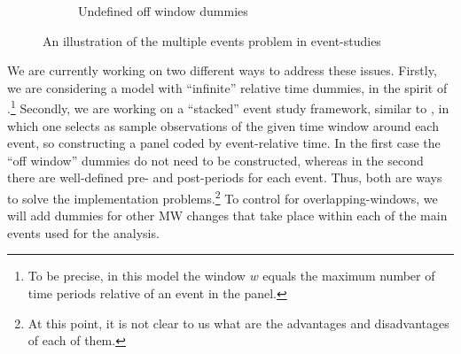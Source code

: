 \begin{figure}[t!]
\begin{subfigure}{1\textwidth}
            \caption{Undefined off window dummies}
        \end{subfigure}
        \caption{An illustration of the multiple events problem in event-studies}
        \label{fig:multiple-events-example}
    \end{figure}
    
    We are currently working on two different ways to address these issues. Firstly, we are considering a model with ``infinite'' relative time dummies, in the spirit of \textcite[][, equation 1]{BorusyakJaravel2017}.\footnote{To be precise, in this model the window $w$ equals the maximum number of time periods relative of an event in the panel.} Secondly, we are working on a ``stacked'' event study framework, similar to \textcite{cengiz2019effect}, in which one selects as sample observations of the given time window around each event, so constructing a panel coded by event-relative time. In the first case the ``off window'' dummies do not need to be constructed, whereas in the second there are well-defined pre- and post-periods for each event. Thus, both are ways to solve the implementation problems.\footnote{At this point, it is not clear to us what are the advantages and disadvantages of each of them.} To control for overlapping-windows, we will add dummies for other MW changes that take place within each of the main events used for the analysis.
    
